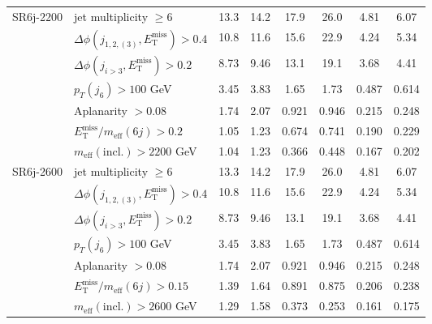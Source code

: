 \documentclass[10pt,fleqn]{article}
\newcommand{\met}{E^\mathrm{miss}_\mathrm{T}}
\newcommand{\meff}{m_\mathrm{eff}}
\begin{document}
\begin{table}[h!]
\begin{tabular}{c|l|c|c|c|c|c|c}
SR6j-2200    & jet multiplicity $\geq 6$                       &     13.3   &   14.2    &  17.9      &   26.0    &      4.81    &   6.07         \\
             & $\Delta\phi(j_{1,2,(3)},\met) > 0.4$            &     10.8   &   11.6    &  15.6      &   22.9    &      4.24    &   5.34         \\
             & $\Delta\phi(j_{i>3},\met) > 0.2$                &     8.73   &   9.46    &  13.1      &   19.1    &      3.68    &   4.41         \\      
             & $p_T(j_6) > 100$ GeV                            &     3.45   &   3.83    &  1.65      &   1.73    &      0.487   &   0.614        \\             
             & Aplanarity $> 0.08$                             &     1.74   &   2.07    &  0.921     &   0.946   &      0.215   &   0.248        \\         
             & $\met/\meff(6j) > 0.2$                          &     1.05   &   1.23    &  0.674     &   0.741   &      0.190   &   0.229        \\    
             & $\meff(\mathrm{incl.}) > 2200$ GeV              &     1.04   &   1.23    &  0.366     &   0.448   &      0.167   &   0.202        \\ \midrule    
SR6j-2600    & jet multiplicity $\geq 6$                       &     13.3   &   14.2    &  17.9      &   26.0    &      4.81    &   6.07         \\
             & $\Delta\phi(j_{1,2,(3)},\met) > 0.4$            &     10.8   &   11.6    &  15.6      &   22.9    &      4.24    &   5.34         \\
             & $\Delta\phi(j_{i>3},\met) > 0.2$                &     8.73   &   9.46    &  13.1      &   19.1    &      3.68    &   4.41         \\      
             & $p_T(j_6) > 100$ GeV                            &     3.45   &   3.83    &  1.65      &   1.73    &      0.487   &   0.614        \\             
             & Aplanarity $> 0.08$                             &     1.74   &   2.07    &  0.921     &   0.946   &      0.215   &   0.248        \\         
             & $\met/\meff(6j) > 0.15$                         &     1.39   &   1.64    &  0.891     &   0.875   &      0.206   &   0.238        \\    
             & $\meff(\mathrm{incl.}) > 2600$ GeV              &     1.29   &   1.58    &  0.373     &   0.253   &      0.161   &   0.175        \\ \bottomrule                 
\end{tabular}
\end{table}   
 \pagestyle{empty}





 
\end{document}
